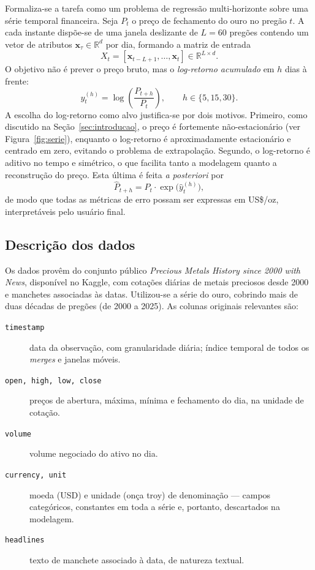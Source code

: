 \documentclass[12pt]{article}
\begin{document}
Formaliza-se a tarefa como um problema de regressão multi-horizonte sobre uma
série temporal financeira. Seja $P_t$ o preço de fechamento do ouro no pregão
$t$. A cada instante dispõe-se de uma janela deslizante de $L = 60$ pregões
contendo um vetor de atributos $\mathbf{x}_\tau \in \mathbb{R}^{d}$ por dia,
formando a matriz de entrada
\begin{equation}
  X_t = [\mathbf{x}_{t-L+1}, \dots, \mathbf{x}_t] \in \mathbb{R}^{L \times d}.
\end{equation}
O objetivo não é prever o preço bruto, mas o \emph{log-retorno acumulado} em
$h$ dias à frente:
\begin{equation}
  y_t^{(h)} = \log\!\left(\frac{P_{t+h}}{P_t}\right),
  \qquad h \in \{5, 15, 30\}.
  \label{eq:alvo}
\end{equation}
A escolha do log-retorno como alvo justifica-se por dois motivos. Primeiro, como
discutido na Seção~\ref{sec:introducao}, o preço é fortemente não-estacionário
(ver Figura~\ref{fig:serie}), enquanto o log-retorno é aproximadamente
estacionário e centrado em zero, evitando o problema de extrapolação. Segundo,
o log-retorno é aditivo no tempo e simétrico, o que facilita tanto a
modelagem quanto a reconstrução do preço. Esta última é feita
\emph{a posteriori} por
\begin{equation}
  \hat{P}_{t+h} = P_t \cdot \exp\!\big(\hat{y}_t^{(h)}\big),
  \label{eq:reconstrucao}
\end{equation}
de modo que todas as métricas de erro possam ser expressas em US\$/oz,
interpretáveis pelo usuário final.

\subsection{Descrição dos dados}
\label{sec:dados}

Os dados provêm do conjunto público \emph{Precious Metals History since 2000
with News}, disponível no Kaggle, com cotações diárias de metais preciosos
desde 2000 e manchetes associadas às datas. Utilizou-se a série do ouro,
cobrindo mais de duas décadas de pregões (de 2000 a 2025). As colunas
originais relevantes são:

\begin{description}
  \item[\texttt{timestamp}] data da observação, com granularidade diária;
        índice temporal de todos os \emph{merges} e janelas móveis.
  \item[\texttt{open, high, low, close}] preços de abertura, máxima, mínima e
        fechamento do dia, na unidade de cotação.
  \item[\texttt{volume}] volume negociado do ativo no dia.
  \item[\texttt{currency, unit}] moeda (USD) e unidade (onça troy) de
        denominação --- campos categóricos, constantes em toda a série e,
        portanto, descartados na modelagem.
  \item[\texttt{headlines}] texto de manchete associado à data, de natureza
        textual.
\end{description}
\end{document}
